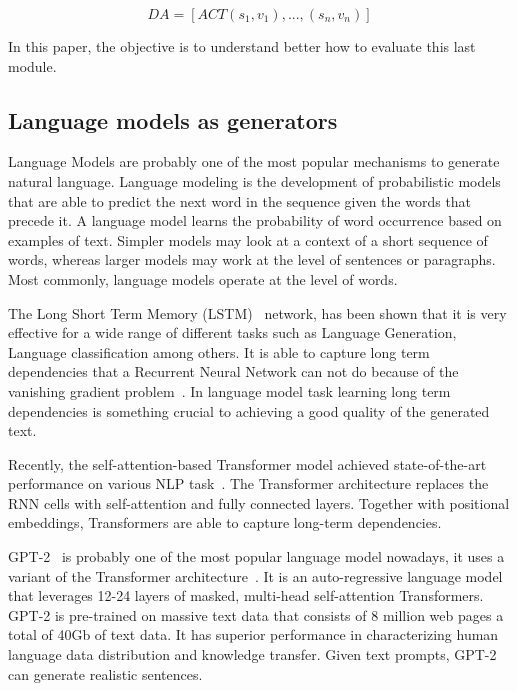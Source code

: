 \documentclass[11pt]{article}
\begin{document}
$$ DA = [ACT{(s_{1},v_{1}), ... ,(s_{n},v_{n})}] $$

In this paper, the objective is to understand better how to evaluate this last module.


\subsection{Language models as generators} \label{language_model}
Language Models are probably one of the most popular mechanisms to generate natural language. Language modeling is the development of probabilistic models that are able to predict the next word in the sequence given the words that precede it.
A language model learns the probability of word occurrence based on examples of text. Simpler models may look at a context of a short sequence of words, whereas larger models may work at the level of sentences or paragraphs. Most commonly, language models operate at the level of words.

The Long Short Term Memory (LSTM)~\cite{hochreiter1997long} network, has been shown that it is very effective for a wide range of different tasks such as Language Generation, Language classification among others. It is able to capture long term dependencies that a Recurrent Neural Network can not do because of the vanishing gradient problem~\cite{bengio1994learning}. In language model task learning long term dependencies is something crucial to achieving a good quality of the generated text.

Recently, the self-attention-based Transformer model achieved state-of-the-art performance on various NLP task~\cite{vaswani2017attention}. The Transformer architecture replaces the RNN cells with self-attention and fully connected layers. Together with positional embeddings, Transformers are able to capture long-term dependencies.

GPT-2~\cite{radford2019language} is probably one of the most popular language model nowadays, it uses a variant of the Transformer  architecture~\cite{vaswani2017attention}. It is an auto-regressive language model that leverages 12-24 layers of masked, multi-head self-attention Transformers. GPT-2 is pre-trained on massive text data that consists of 8 million web pages a total of 40Gb of text data. It has superior performance in characterizing human language data distribution and knowledge transfer. Given text prompts, GPT-2 can generate realistic sentences.

\end{document}

